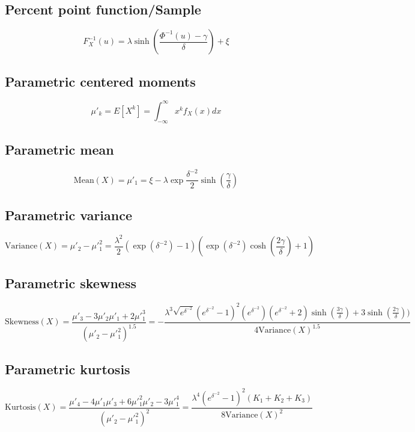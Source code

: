 \documentclass{article}
\begin{document}
\subsection{Percent point function/Sample}
\begin{equation*} F^{-1}_{X}\left(u\right)=\lambda\sinh\left(\frac{\Phi^{-1}(u)-\gamma}{\delta}\right)+\xi \end{equation*}
\subsection{Parametric centered moments}
\begin{equation*} \mu'_{k}=E[X^k]=\int_{-\infty }^{\infty }x^{k}f_{X}\left(x\right)dx \end{equation*}
\subsection{Parametric mean}
\begin{equation*} \mathrm{Mean}(X)=\mu'_{1}=\xi-\lambda \exp\frac{\delta^{-2}}{2} \sinh\left(\frac{\gamma}{\delta}\right) \end{equation*}
\subsection{Parametric variance}
\begin{equation*} \mathrm{Variance}(X)=\mu'_{2}-\mu'^{2}_{1}=\frac{\lambda^2}{2} (\exp(\delta^{-2})-1)\left(\exp(\delta^{-2}) \cosh\left(\frac{2\gamma}{\delta}\right) +1\right) \end{equation*}
\subsection{Parametric skewness}
\begin{equation*} \mathrm{Skewness}(X)=\frac{\mu'_{3}-3\mu'_{2}\mu'_{1}+2\mu'^{3}_{1}}{(\mu'_{2}-\mu'^{2}_{1})^{1.5}}=-\frac{\lambda^{3}\sqrt{e^{\delta^{-2}}}(e^{\delta^{-2}}-1)^{2}(e^{\delta^{-2}})(e^{\delta^{-2}}+2)\sinh(\frac{3\gamma}{\delta})+3\sinh(\frac{2\gamma}{\delta}))}{4\mathrm{Variance}(X)^{1.5}} \end{equation*}
\subsection{Parametric kurtosis}
\begin{equation*} \mathrm{Kurtosis}(X)=\frac{\mu'_{4}-4\mu'_{1}\mu'_{3}+6\mu'^{2}_{1}\mu'_{2}-3\mu'^{4}_{1}}{(\mu'_{2}-\mu'^{2}_{1})^{2}}=\frac{\lambda^{4}(e^{\delta^{-2}}-1)^{2}(K_{1}+K_{2}+K_{3})}{8\mathrm{Variance}(X)^{2}} \end{equation*}
\end{document}
